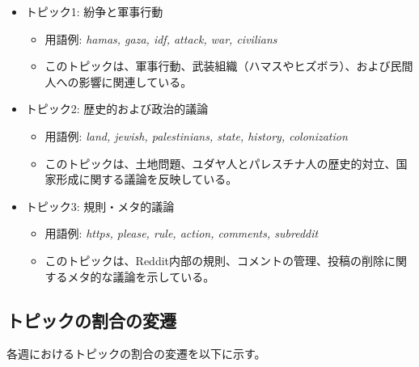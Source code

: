 \documentclass[11pt, a4j]{jreport}
\begin{document}
    \begin{itemize}
        \item トピック1: 紛争と軍事行動 
        \begin{itemize}
            \item 用語例: \textit{hamas, gaza, idf, attack, war, civilians}  
            \item このトピックは、軍事行動、武装組織（ハマスやヒズボラ）、および民間人への影響に関連している。
        \end{itemize}
        \item トピック2: 歴史的および政治的議論  
        \begin{itemize}
            \item 用語例: \textit{land, jewish, palestinians, state, history, colonization}  
            \item このトピックは、土地問題、ユダヤ人とパレスチナ人の歴史的対立、国家形成に関する議論を反映している。
        \end{itemize}
        \item トピック3: 規則・メタ的議論  
        \begin{itemize}
            \item 用語例: \textit{https, please, rule, action, comments, subreddit}  
            \item このトピックは、Reddit内部の規則、コメントの管理、投稿の削除に関するメタ的な議論を示している。
        \end{itemize}
    \end{itemize}

    \subsection*{トピックの割合の変遷}
    各週におけるトピックの割合の変遷を以下に示す。

    \begin{table}[H]
    \centering
    \caption{各週におけるトピックの割合}
    \label{tab:topic_ratios}
    \end{table}
\end{document}
